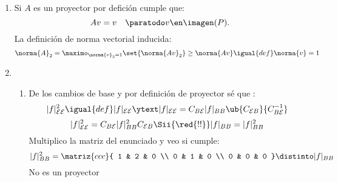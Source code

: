 \begin{enumerate}[label=\alph*)]
  \item Si $A$ es un proyector por defición cumple que:
        $$
          Av = v \quad \paratodo v \en \imagen(P).
        $$
        La definición de norma vectorial inducida:
        $$
          \norma{A}_2 = \maximo_{\norma{v}_2 = 1}\set{\norma{Av}_2} \geq \norma{Av} \igual{def} \norma{v} = 1
        $$

  \item
        \begin{enumerate}[label=\roman*)]
          \item
                De los cambios de base y por definición de proyector sé que :
                $$
                  |f|_{\mathcal{EE}}^2 \igual{def} |f|_{\mathcal{EE}}
                  \ytext
                  |f|_{\mathcal{EE}} = C_{B\mathcal{E}}|f|_{BB}\ub{C_{\mathcal{E}B}}{C_{B\mathcal{E}}^{-1}}
                $$
                $$
                  |f|_{\mathcal{EE}}^2 = C_{B\mathcal{E}} |f|_{BB}^2 C_{\mathcal{E}B}
                  \Sii{\red{!!}} |f|_{BB} = |f|_{BB}^2
                $$
                Multiplico la matriz del enunciado y veo si cumple:
                $$
                  |f|_{BB}^2 =
                  \matriz{ccc}{
                    1 & 2 & 0 \\
                    0 & 1 & 0 \\
                    0 & 0 & 0
                  }
                  \distinto
                  |f|_{BB}
                $$
                No es un proyector


\end{enumerate}
\end{enumerate}
